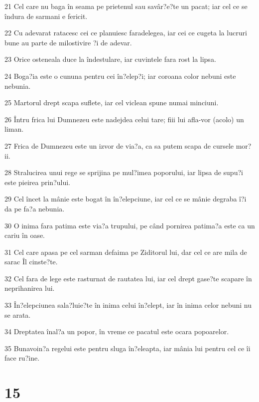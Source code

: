 \par 21 Cel care nu baga în seama pe prietenul sau savâr?e?te un pacat; iar cel ce se îndura de sarmani e fericit.
\par 22 Cu adevarat ratacesc cei ce planuiesc faradelegea, iar cei ce cugeta la lucruri bune au parte de milostivire ?i de adevar.
\par 23 Orice osteneala duce la îndestulare, iar cuvintele fara rost la lipsa.
\par 24 Boga?ia este o cununa pentru cei în?elep?i; iar coroana color nebuni este nebunia.
\par 25 Martorul drept scapa suflete, iar cel viclean spune numai minciuni.
\par 26 Întru frica lui Dumnezeu este nadejdea celui tare; fiii lui afla-vor (acolo) un liman.
\par 27 Frica de Dumnezeu este un izvor de via?a, ca sa putem scapa de cursele mor?ii.
\par 28 Stralucirea unui rege se sprijina pe mul?imea poporului, iar lipsa de supu?i este pieirea prin?ului.
\par 29 Cel încet la mânie este bogat în în?elepciune, iar cel ce se mânie degraba î?i da pe fa?a nebunia.
\par 30 O inima fara patima este via?a trupului, pe când pornirea patima?a este ca un cariu în oase.
\par 31 Cel care apasa pe cel sarman defaima pe Ziditorul lui, dar cel ce are mila de sarac Îl cinste?te.
\par 32 Cel fara de lege este rasturnat de rautatea lui, iar cel drept gase?te scapare în neprihanirea lui.
\par 33 În?elepciunea sala?luie?te în inima celui în?elept, iar în inima celor nebuni nu se arata.
\par 34 Dreptatea înal?a un popor, în vreme ce pacatul este ocara popoarelor.
\par 35 Bunavoin?a regelui este pentru sluga în?eleapta, iar mânia lui pentru cel ce îi face ru?ine.

\chapter{15}


